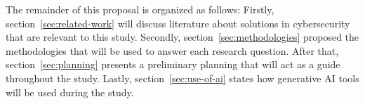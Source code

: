 The remainder of this proposal is organized as follows:
Firstly, section\ \ref{sec:related-work} will discuss literature about solutions in cybersecurity that are relevant to
this study.
Secondly, section\ \ref{sec:methodologies} proposed the methodologies that will be used to answer each research
question.
After that, section\ \ref{sec:planning} presents a preliminary planning that will act as a guide throughout the study.
Lastly, section\ \ref{sec:use-of-ai} states how generative AI tools will be used during the study.
